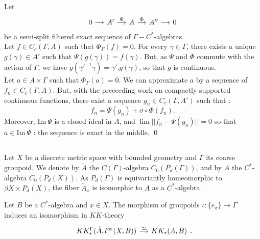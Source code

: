 \begin{dem}
Let 
\[\begin{tikzcd}[column sep = small] 0\arrow{r} & A' \arrow{r}{\Psi} & A\arrow{r}{\Phi} & A'' \arrow{r} & 0\end{tikzcd}\]
be a semi-split filtered exact sequence of $\Gamma-C^*$-algebras.\\

Let $f\in C_c(\Gamma, A)$ such that $\Phi_\Gamma(f)=0$. For every $\gamma \in \Gamma$, there exists a unique $g(\gamma)\in A'$ such that $\Psi(g(\gamma))=f(\gamma)$. But, as $\Psi$ and $\Phi$ commute with the action of $\Gamma$, we have $g(\gamma'^{-1}\gamma)=\gamma' . g(\gamma)$, so that $g$ is continuous.\\

Let $a\in A\times \Gamma$ such that $\Phi_\Gamma(a)=0$. We can approximate $a$ by a sequence of $f_n\in C_c(\Gamma,A)$. But, with the preceeding work on compactly supported continuous functions, there exist a sequence $g_n\in C_c(\Gamma, A')$ such that :
\[f_n = \Psi(g_n)+\sigma\circ \Phi(f_n).\]
Moreover, $\text{Im}\ \Psi$ is a closed ideal in $A$, and $\lim ||f_n-\Psi(g_n)||=0$ so that $a\in \text{Im} \ \Psi$ : the sequence is exact in the middle.
\qed
\end{dem}

\subsection{}
Let $X$ be a discrete metric space with bounded geometry and $\Gamma$ its coarse groupoid. We denote by $\tilde A $ the $C(\Gamma)$-algebra $C_0(P_d(\Gamma))$, and by $A$ the $C^*$-algebra $C_0(P_d(X))$. As $P_d(\Gamma)$ is equivariantly homeomorphic to $\beta X \times P_d(X)$, the fiber $\tilde A_x$ is isomorphic to $A$ as a $C^*$-algebra.\\
 
\begin{lem}
Let $B$ be a $C^*$-algebra and $x\in X$. The morphism of groupoids $\iota : \{e_x\}\rightarrow \Gamma$ induces an isomorphism in $KK$-theory 
\[\begin{tikzcd}[column sep = small] KK_*^\Gamma(\tilde A, l^\infty(X, B))\arrow{r}{\simeq} & KK_*(A, B)\end{tikzcd}.\]
\end{lem}

